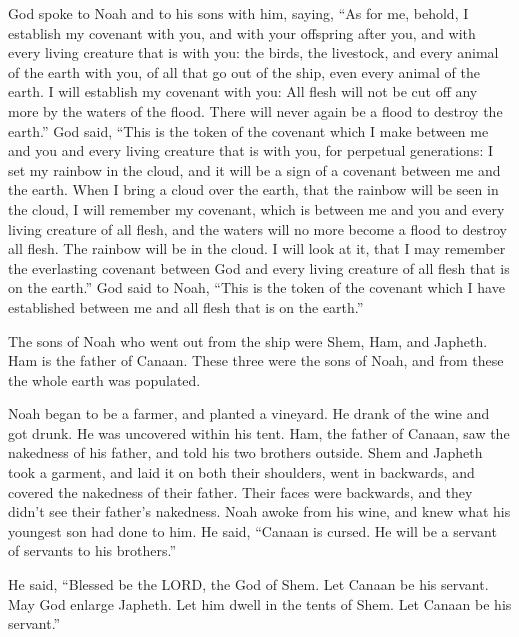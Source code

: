  God spoke to Noah and to his sons with him, saying,
 ``As for me, behold, I establish my covenant with you,
and with your offspring after you,  and with every living
creature that is with you: the birds, the livestock, and every animal of
the earth with you, of all that go out of the ship, even every animal of
the earth.  I will establish my covenant with you: All
flesh will not be cut off any more by the waters of the flood. There
will never again be a flood to destroy the earth.''  God
said, ``This is the token of the covenant which I make between me and
you and every living creature that is with you, for perpetual
generations:  I set my rainbow in the cloud, and it will
be a sign of a covenant between me and the earth.  When I
bring a cloud over the earth, that the rainbow will be seen in the
cloud,  I will remember my covenant, which is between me
and you and every living creature of all flesh, and the waters will no
more become a flood to destroy all flesh.  The rainbow
will be in the cloud. I will look at it, that I may remember the
everlasting covenant between God and every living creature of all flesh
that is on the earth.''  God said to Noah, ``This is the
token of the covenant which I have established between me and all flesh
that is on the earth.''

 The sons of Noah who went out from the ship were Shem,
Ham, and Japheth. Ham is the father of Canaan.  These
three were the sons of Noah, and from these the whole earth was
populated.

 Noah began to be a farmer, and planted a vineyard.
 He drank of the wine and got drunk. He was uncovered
within his tent.  Ham, the father of Canaan, saw the
nakedness of his father, and told his two brothers outside.
 Shem and Japheth took a garment, and laid it on both
their shoulders, went in backwards, and covered the nakedness of their
father. Their faces were backwards, and they didn't see their father's
nakedness.  Noah awoke from his wine, and knew what his
youngest son had done to him.  He said, ``Canaan is
cursed. He will be a servant of servants to his brothers.''

 He said, ``Blessed be the LORD, the God of Shem. Let
Canaan be his servant.  May God enlarge Japheth. Let him
dwell in the tents of Shem. Let Canaan be his servant.''

